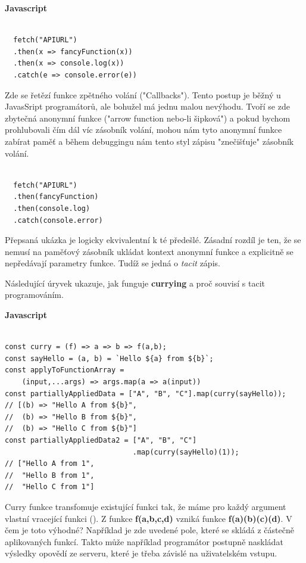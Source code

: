 \documentclass[male,czech]{kithesis}
\begin{document}
\textbf{Javascript}
\begin{verbatim}

  fetch("APIURL")
  .then(x => fancyFunction(x))
  .then(x => console.log(x))
  .catch(e => console.error(e))

\end{verbatim}

Zde se řetězí funkce zpětného volání ("Callbacks"). 
Tento postup je běžný u JavasSript programátorů,
ale bohužel má jednu malou nevýhodu.
Tvoří se zde zbytečná anonymní funkce ("arrow function nebo-li šipková") 
a pokud bychom prohlubovali čím dál víc zásobník volání,
mohou nám tyto anonymní funkce zabírat paměť a 
během debuggingu nám tento styl zápisu "znečišťuje" 
zásobník volání. 

\begin{verbatim}

  fetch("APIURL")
  .then(fancyFunction)
  .then(console.log)
  .catch(console.error)

\end{verbatim}

Přepsaná ukázka je logicky ekvivalentní k té předešlé. 
Zásadní rozdíl je ten, 
že se nemusí na paměťový zásobník ukládat kontext anonymní funkce 
a explicitně se nepředávají parametry funkce. 
Tudíž se jedná o \textit{tacit} zápis.

Následující úryvek ukazuje, 
jak funguje \textbf{currying} a proč souvisí s tacit programováním.

\textbf{Javascript}
\begin{verbatim}

const curry = (f) => a => b => f(a,b);
const sayHello = (a, b) = `Hello ${a} from ${b}`;
const applyToFunctionArray = 
    (input,...args) => args.map(a => a(input))
const partiallyAppliedData = ["A", "B", "C"].map(curry(sayHello)); 
// [(b) => "Hello A from ${b}", 
//  (b) => "Hello B from ${b}", 
//  (b) => "Hello C from ${b}"]
const partiallyAppliedData2 = ["A", "B", "C"]
                              .map(curry(sayHello)(1)); 
// ["Hello A from 1", 
//  "Hello B from 1", 
//  "Hello C from 1"]

\end{verbatim}
Curry funkce transfomuje existující funkci tak, 
že máme pro každý argument vlastní vracející funkci  (\cite{Currying}). 
Z funkce \textbf{f(a,b,c,d)} vzniká funkce \textbf{f(a)(b)(c)(d)}.
V čem je toto výhodné?
Například je zde uvedené pole, 
které se skládá z částečně aplikovaných funkcí. 
Takto může například programátor postupně naskládat výsledky opovědí ze serveru,
které je třeba závislé na uživatelském vstupu. 
\end{document}
